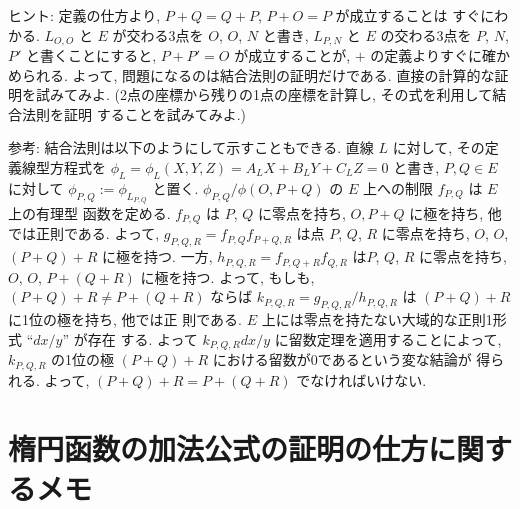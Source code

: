 \documentclass[12pt,twoside]{jarticle}
\begin{document}
\noindent ヒント: 定義の仕方より, $P+Q=Q+P$, $P+O=P$ が成立することは
すぐにわかる. $L_{O,O}$ と $E$ が交わる3点を $O$, $O$, $N$ と書き, %
$L_{P,N}$ と $E$ の交わる3点を $P$, $N$, $P'$ と書くことにすると, %
$P+P'=O$ が成立することが, $+$ の定義よりすぐに確かめられる. よって, 
問題になるのは結合法則の証明だけである. 直接の計算的な証明を試みてみよ.
(2点の座標から残りの1点の座標を計算し, その式を利用して結合法則を証明
することを試みてみよ.)

\medskip

\noindent 参考: 結合法則は以下のようにして示すこともできる. 直線 $L$ %
に対して, その定義線型方程式を $\phi_L=\phi_L(X,Y,Z)=A_LX+B_LY+C_LZ=0$ 
と書き, $P,Q\in E$ に対して $\phi_{P,Q}:=\phi_{L_{P,Q}}$ と置く. %
$\phi_{P,Q}/\phi(O,P+Q)$ の $E$ 上への制限 $f_{P,Q}$ は $E$ 上の有理型
函数を定める. $f_{P,Q}$ は $P$, $Q$ に零点を持ち, $O,P+Q$ に極を持ち, 
他では正則である. よって, $g_{P,Q,R}=f_{P,Q}f_{P+Q,R}$ は点 $P$, $Q$,
$R$ に零点を持ち, $O$, $O$, $(P+Q)+R$ に極を持つ. %
一方, $h_{P,Q,R}=f_{P,Q+R}f_{Q,R}$ は$P$, $Q$, $R$ に零点を持ち, $O$,
$O$, $P+(Q+R)$ に極を持つ. よって, もしも, $(P+Q)+R\ne P+(Q+R)$ ならば %
$k_{P,Q,R}=g_{P,Q,R}/h_{P,Q,R}$ は $(P+Q)+R$ に1位の極を持ち, 他では正
則である. $E$ 上には零点を持たない大域的な正則1形式 ``$dx/y$'' が存在
する. よって $k_{P,Q,R} dx/y$ に留数定理を適用することによって, %
$k_{P,Q,R}$ の1位の極 $(P+Q)+R$ における留数が0であるという変な結論が
得られる. よって, $(P+Q)+R=P+(Q+R)$ でなければいけない.


\section{楕円函数の加法公式の証明の仕方に関するメモ}
\end{document}
